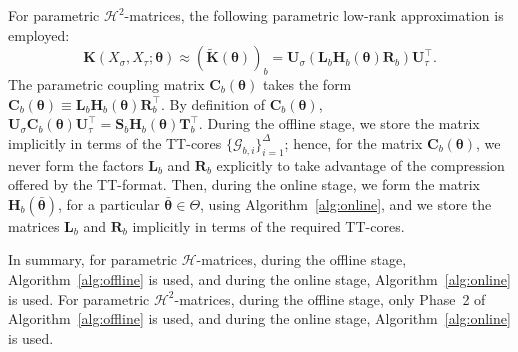\documentclass[final,3p,times]{elsarticle}
\newcommand{\mc}[1]{\mathcal{#1}}
\renewcommand{\vec}[1]{\boldsymbol{#1}}
\newcommand{\mat}[1]{\boldsymbol{#1}}
\newcommand{\ten}[1]{\boldsymbol{\mathcal{#1}}}
\newcommand{\mathat}[1]{\widetilde{\boldsymbol{#1}}}
\renewcommand{\t}{^\top}
\begin{document}
For parametric $\mc{H}^{2}$-matrices,  the  following parametric low-rank approximation is employed:
\begin{equation}\label{eqn:ff_h2_approx}
\mat{K}({X}_{\sigma}, {X}_{\tau}; {\vec{\theta}}) \approx (\mathat{K}(\vec\theta))_b =  \mat{U}_{\sigma} (\mat{L}_b\mat{H}_{b}(\vec{\theta}) \mat{R}_b) \mat{U}_{\tau}^{\top}.
\end{equation}
The parametric coupling matrix $\mat{C}_{b}(\vec{\theta})$ takes the form $\mat{C}_{b}(\vec{\theta}) \equiv \mat{L}_{b}\mat{H}_b(\vec{\theta})\mat{R}_{b}^{\top}.$  By definition of $\mat{C}_{b}(\vec{\theta})$,
$\mat{U}_\sigma \mat{C}_{b}(\vec\theta)\mat{U}_\tau\t = \mat{S}_b \mat{H}_b(\vec\theta)\mat{T}_b\t$. During the offline stage, we store the matrix implicitly in terms of the TT-cores $\{\ten{G}_{b, i} \}_{i=1}^{\Delta}$; hence, for the matrix $\mat{C}_{b}(\vec{\theta})$, we never form the factors $\mat{L}_{b}$ and $\mat{R}_{b}$ explicitly to take advantage of the compression offered by the TT-format. Then, during the online stage, we form the matrix $\mat{H}_{b}(\bar{\vec{\theta}})$, for a particular $\bar{\vec{\theta}} \in \Theta$, using Algorithm~\ref{alg:online}, and we store the matrices $\mat{L}_{b}$ and $\mat{R}_{b}$ implicitly in terms of the required TT-cores.


In summary, for parametric $\mc{H}$-matrices, during the offline stage,  Algorithm~\ref{alg:offline} is used, and during the online stage,  Algorithm~\ref{alg:online} is used. For parametric $\mc{H}^{2}$-matrices, during the offline stage, only Phase~2 of Algorithm~\ref{alg:offline} is used, and during the online stage,  Algorithm~\ref{alg:online} is used. 
\end{document}
